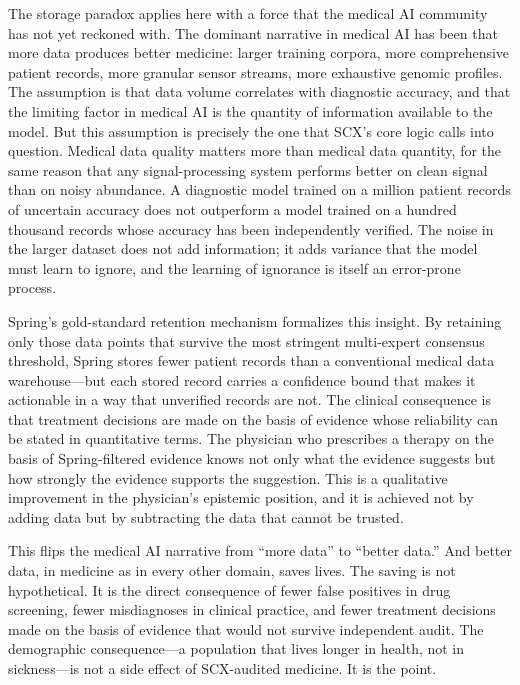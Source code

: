 \documentclass[12pt,a4paper]{article}
\begin{document}
The storage paradox applies here with a force that the medical AI community has not yet reckoned with. The dominant narrative in medical AI has been that more data produces better medicine: larger training corpora, more comprehensive patient records, more granular sensor streams, more exhaustive genomic profiles. The assumption is that data volume correlates with diagnostic accuracy, and that the limiting factor in medical AI is the quantity of information available to the model. But this assumption is precisely the one that SCX's core logic calls into question. Medical data quality matters more than medical data quantity, for the same reason that any signal-processing system performs better on clean signal than on noisy abundance. A diagnostic model trained on a million patient records of uncertain accuracy does not outperform a model trained on a hundred thousand records whose accuracy has been independently verified. The noise in the larger dataset does not add information; it adds variance that the model must learn to ignore, and the learning of ignorance is itself an error-prone process.

Spring's gold-standard retention mechanism formalizes this insight. By retaining only those data points that survive the most stringent multi-expert consensus threshold, Spring stores fewer patient records than a conventional medical data warehouse---but each stored record carries a confidence bound that makes it actionable in a way that unverified records are not. The clinical consequence is that treatment decisions are made on the basis of evidence whose reliability can be stated in quantitative terms. The physician who prescribes a therapy on the basis of Spring-filtered evidence knows not only what the evidence suggests but how strongly the evidence supports the suggestion. This is a qualitative improvement in the physician's epistemic position, and it is achieved not by adding data but by subtracting the data that cannot be trusted.

This flips the medical AI narrative from ``more data'' to ``better data.'' And better data, in medicine as in every other domain, saves lives. The saving is not hypothetical. It is the direct consequence of fewer false positives in drug screening, fewer misdiagnoses in clinical practice, and fewer treatment decisions made on the basis of evidence that would not survive independent audit. The demographic consequence---a population that lives longer in health, not in sickness---is not a side effect of SCX-audited medicine. It is the point.
\end{document}
